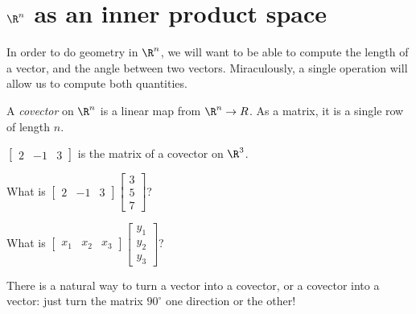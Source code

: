 
\section{$\R^n$ as an inner product space}
In order to do geometry in $\R^n$, we will want to be able to compute the length of a vector, and the angle between two vectors.   Miraculously, a single operation will allow us to
compute both quantities.

\begin{definition}
	A \textit{covector} on $\R^n$ is a linear map from $\R^n \to R$.  As a matrix, it is a single row of length $n$.
\end{definition}

\begin{example}
	$\begin{bmatrix} 2 & -1 & 3 \end{bmatrix}$ is the matrix of a covector on $\R^3$.
\end{example}

\begin{question}
	What is $\begin{bmatrix} 2 & -1 & 3 \end{bmatrix} \begin{bmatrix} 3 \\5\\7 \end{bmatrix}$?
\end{question}

\begin{question}
	What is $\begin{bmatrix} x_1 & x_2 & x_3 \end{bmatrix} \begin{bmatrix} y_1 \\y_2\\y_3 \end{bmatrix}$?
\end{question}

There is a natural way to turn a vector into a covector, or a covector into a vector:  just turn the matrix $90^\circ$ one direction or the other!

